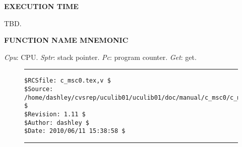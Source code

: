 \noindent\textbf{EXECUTION TIME}
\begin{list}{}{\setlength{\leftmargin}{0.25in}\setlength{\topsep}{0.0in}}
\item TBD.
\end{list}
\vspace{2.8ex}

\noindent\textbf{FUNCTION NAME MNEMONIC}
\begin{list}{}{\setlength{\leftmargin}{0.25in}\setlength{\topsep}{0.0in}}
\item \emph{Cpu}:  CPU.  
      \emph{Sptr}: stack pointer.  
      \emph{Pc}:   program counter.  
      \emph{Get}:  get.
\end{list}


\noindent\begin{figure}[!b]
\noindent\rule[-0.25in]{\textwidth}{1pt}
\begin{tiny}
\begin{verbatim}
$RCSfile: c_msc0.tex,v $
$Source: /home/dashley/cvsrep/uculib01/uculib01/doc/manual/c_msc0/c_msc0.tex,v $
$Revision: 1.11 $
$Author: dashley $
$Date: 2010/06/11 15:38:58 $
\end{verbatim}
\end{tiny}
\noindent\rule[0.25in]{\textwidth}{1pt}
\end{figure}

%
%
%
%
%
%

